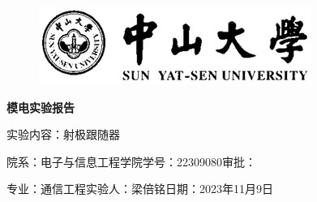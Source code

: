 \documentclass[a4paper,10pt,notitlepage]{article}
\begin{document}
	\large
	\onehalfspacing
	\begin{figure}[h]
		\raggedright
		\includegraphics{../1.png}
	\end{figure}
	\centering
	{\Huge\textbf{模电实验报告}\par}
	\vspace{0.2cm}
	{\huge{实验内容：射极跟随器}\par}
	\raggedright
	\vspace{0.3cm}
	\begin{centering}
		{\large 院系：电子与信息工程学院\hfill 学号：22309080\hfill 审批：\hspace{2cm} \par
			专业：通信工程\hfill 实验人：梁倍铭\hfill 日期：2023年11月9日 \par}
	\end{centering}
	\vspace{0.3cm}
\end{document}
